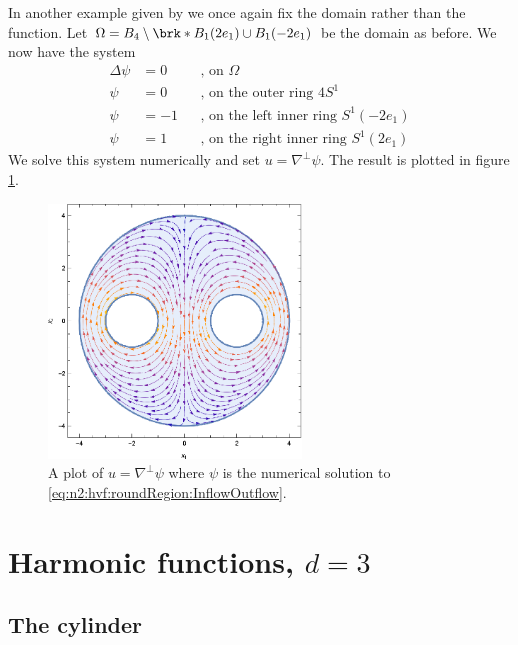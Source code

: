 In another example given by \cite{Wahlen2023} we once again fix the domain rather than the function.
Let $\Omega=B_4\setminus\brk*{B_1(2e_1)\cup B_1(-2e_1)}$ be the domain as before.
We now have the system
\begin{equation}
  \begin{aligned}
    \Delta \psi&=0 &&\text{, on }\Omega \\
    \psi&=0 &&\text{, on the outer ring }4S^1 \\
    \psi&=-1 &&\text{, on the left inner ring }S^1(-2e_1) \\
    \psi&=1 &&\text{, on the right inner ring }S^1(2e_1)
  \end{aligned}\label{eq:n2:hvf:roundRegion:InflowOutflow}
\end{equation}
We solve this system numerically and set $u=\nabla^\perp\psi$.
The result is plotted in figure \ref{pl:n2_hvf_roundRegion_InflowOutflow}.
\begin{figure}
  \centering
  \includegraphics[width=0.6\textwidth]{../Plots/HarmonicVectorFields_gr5.eps}
  \caption{A plot of $u=\nabla^\perp\psi$ where $\psi$ is the numerical solution to
   \eqref{eq:n2:hvf:roundRegion:InflowOutflow}.}
  \label{pl:n2_hvf_roundRegion_InflowOutflow}
\end{figure}

\newpage

\chapter{Harmonic functions, $d=3$}

\section{The cylinder}

